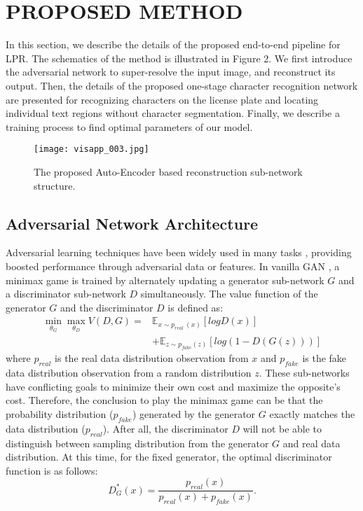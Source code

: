 \documentclass[a4paper,twoside]{article}
\begin{document}
\section{\uppercase{Proposed Method}}

In this section, we describe the details of the proposed end-to-end pipeline for LPR. The schematics of the method is illustrated in Figure 2. We first  introduce the adversarial network to super-resolve the input image, and reconstruct its output. Then, the details of the proposed one-stage character recognition network are presented for recognizing characters on the license plate and locating individual text regions without character segmentation. Finally, we describe a training process to find optimal parameters of our model.

\begin{figure*}[t]
    \begin{center}
\texttt{[image: visapp\_003.jpg]}
    \end{center}
       \caption{The proposed Auto-Encoder based reconstruction sub-network structure.}
    \label{fig:long}
    \label{fig:onecol}
    \end{figure*}
    
\subsection{Adversarial Network Architecture}
    Adversarial learning techniques have been widely used in many tasks \cite{frid2018gan,zhu2017unpaired,rajeswar2017adversarial,chou2017self}, providing boosted performance through adversarial data or features. In vanilla GAN \cite{goodfellow2014generative}, a minimax game is trained by alternately updating a generator sub-network $G$ and a discriminator sub-network $D$ simultaneously. The value function of the generator $G$ and the discriminator $D$ is defined as:
\begin{equation}
        \begin{split}
            \min_{\theta_G} \max_{\theta_D} V(D,G) = &\mathbb{E}_{x\sim p_{real}~(x)}[log D(x)] \\
            & + \mathbb{E}_{z\sim p_{fake}(z)}[log(1-D(G(z)))]
        \end{split}
        \end{equation}
    where $p_{real}$ is the real data distribution observation from $x$ and $p_{fake}$ is the fake data distribution observation from a random distribution $z$. These sub-networks have conflicting goals to minimize their own cost and maximize the opposite's cost. Therefore, the conclusion to play the minimax game can be that the probability distribution ($p_{fake}$) generated by the generator $G$ exactly matches the data distribution ($p_{real}$). After all, the discriminator $D$ will not be able to distinguish between sampling distribution from the generator $G$ and real data distribution. At this time, for the fixed generator, the optimal discriminator function is as follows:
\begin{equation}
            D_{G}^*(x) = \frac{p_{real}(x)}{p_{real}(x) + p_{fake}(x)}.
        \end{equation}
    
\end{document}
